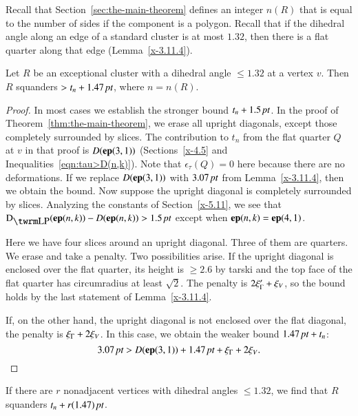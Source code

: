 Recall that Section~\ref{sec:the-main-theorem} defines an integer $n(R)$
that is equal to the number of sides if the component is a polygon.  Recall
that if the dihedral angle along an edge of a standard cluster is at
most $1.32$, then there is a flat quarter along that edge
(Lemma~\ref{x-3.11.4}).



\begin{lemma}
Let $R$ be an exceptional cluster with a dihedral angle
$\le1.32$ at a vertex $v$. Then $R$ squanders $>t_n+1.47\,\hbox{\it pt}$, where
$n=n(R)$.
\end{lemma}

\begin{proof}
In most cases we establish the stronger bound $t_n+1.5\,\hbox{\it pt}$. In the
proof of Theorem~\ref{thm:the-main-theorem}, we erase all upright
diagonals, except those completely surrounded by slices. The
contribution to $t_n$ from the flat quarter $Q$ at $v$ in that proof is
$D({\operatorname{\bf ep}}{(3,1)})$ (Sections~\ref{x-4.5} and Inequalities~\ref{eqn:tau>D(n,k)}).
Note that $\epsilon_\tau(Q)=0$ here because there are no deformations.
If we replace $D({\operatorname{\bf ep}}{(3,1)})$ with $3.07\,\hbox{\it pt}$ from Lemma~\ref{x-3.11.4}, then
we obtain the bound. Now suppose the upright diagonal is completely
surrounded by slices. Analyzing the constants of
Section~\ref{x-5.11}, we see that $\DLP(\y{(n,k)})-D(\y{(n,k)})>1.5\,\pt$ except
when ${\operatorname{\bf ep}}{(n,k)}={\operatorname{\bf ep}}{(4,1)}$.

Here we have four slices around an upright diagonal. Three
of them are quarters.  We erase and take a penalty. Two possibilities
arise.  If the upright diagonal is enclosed over the flat quarter, its
height is $\ge2.6$ by tarski and the top face of the
flat quarter has circumradius at least $\sqrt2$.  The penalty is
$2\xi_\Gamma'+\xi_V$, so the bound holds by the last statement of
Lemma~\ref{x-3.11.4}.

If, on the other hand, the upright diagonal is not enclosed over the
flat diagonal, the penalty is $\xi_\Gamma+2\xi_V$.  In this case, we obtain the
weaker bound $1.47\,\hbox{\it pt}+t_n$:
    $$3.07\,\hbox{\it pt} > D({\operatorname{\bf ep}}{(3,1)}) + 1.47\,\hbox{\it pt} +\xi_\Gamma+2\xi_V.$$
\end{proof}

\begin{remark} \label{remark:1.47}
If there are $r$ nonadjacent vertices with dihedral angles
$\le1.32$, we find that $R$ squanders $t_n+r(1.47)\,\hbox{\it pt}$.
\end{remark}

